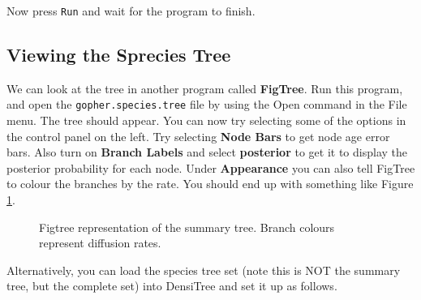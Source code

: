 \documentclass{article}
\begin{document}
Now press \texttt{Run} and wait for the program to finish.

\subsection*{Viewing the Sprecies Tree}

We can look at the tree in another program called {\bf FigTree}. Run this program, and open
the \texttt{gopher.species.tree} file by using the Open command in the File menu. The tree should appear.
You can now try selecting some of the options in the control panel on the left. Try selecting
{\bf Node Bars} to get node age error bars. Also turn on {\bf Branch Labels} and select {\bf posterior} to get
it to display the posterior probability for each node. Under {\bf Appearance} you can also tell FigTree
to colour the branches by the rate.
You should end up with something like Figure \ref{fig.figtree}.

\begin{figure}
\begin{center}


\end{center}
\caption{\label{fig.figtree} Figtree representation of the summary tree. Branch colours represent diffusion rates.}
\end{figure}


Alternatively, you can load the species tree set (note this is NOT the summary tree, but the complete set) into DensiTree and set it up as follows.
\end{document}
